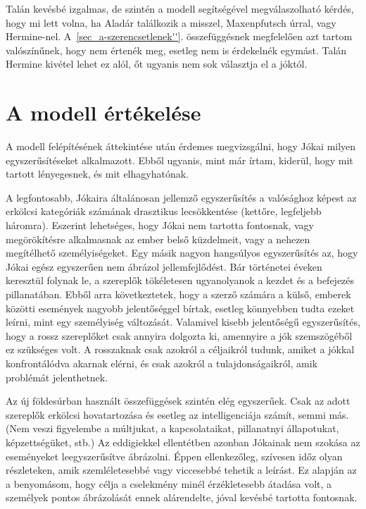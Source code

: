 \documentclass[a4paper,12pt]{thesis-ekf}
\begin{document}
    Talán kevésbé izgalmas, de szintén a modell segítségével megválaszolható kérdés, hogy mi lett volna,
        ha Aladár találkozik a misszel, Maxenpfutsch úrral, vagy Hermine-nel.
    A~\ref{sec_a-szerencsetlenek''}. összefüggésnek megfelelően azt tartom valószínűnek, hogy nem értenék meg,
        esetleg nem is érdekelnék egymást.
    Talán Hermine kivétel lehet ez alól, őt ugyanis nem sok választja el a jóktól.

    \section{A modell értékelése}

    A modell felépítésének áttekintése után érdemes megvizsgálni, hogy Jókai milyen egyszerűsítéseket alkalmazott.
    Ebből ugyanis, mint már írtam, kiderül, hogy mit tartott lényegesnek, és mit elhagyhatónak.

    A legfontosabb, Jókaira általánosan jellemző egyszerűsítés a valósághoz képest az erkölcsi kategóriák számának
        drasztikus lecsökkentése (kettőre, legfeljebb háromra).
    Eszerint lehetséges, hogy Jókai nem tartotta fontosnak, vagy megörökítésre alkalmasnak az ember belső küzdelmeit,
        vagy a nehezen megítélhető személyiségeket.
    Egy másik nagyon hangsúlyos egyszerűsítés az, hogy Jókai egész egyszerűen nem ábrázol jellemfejlődést.
    Bár történetei éveken keresztül folynak le, a szereplők tökéletesen ugyanolyanok a kezdet és a befejezés pillanatában.
    Ebből arra következtetek, hogy a szerző számára a külső, emberek közötti események nagyobb jelentőséggel bírtak,
        esetleg könnyebben tudta ezeket leírni, mint egy személyiség változását.
    Valamivel kisebb jelentőségű egyszerűsítés, hogy a rossz szereplőket csak annyira dolgozta ki,
        amennyire a jók szemszögéből ez szükséges volt.
    A rosszaknak csak azokról a céljaikról tudunk, amiket a jókkal konfrontálódva akarnak elérni, és csak azokról
        a tulajdonságaikról, amik problémát jelenthetnek.

    Az új földesúrban használt összefüggések szintén elég egyszerűek.
    Csak az adott szereplők erkölcsi hovatartozása és esetleg az intelligenciája számít, semmi más.
    (Nem veszi figyelembe a múltjukat, a kapcsolataikat, pillanatnyi állapotukat, képzettségüket, stb.)
    Az eddigiekkel ellentétben azonban Jókainak nem szokása az eseményeket leegyszerűsítve ábrázolni.
    Éppen ellenkezőleg, szívesen időz olyan részleteken, amik szemléletesebbé vagy viccesebbé tehetik a leírást.
    Ez alapján az a benyomásom, hogy célja a cselekmény minél érzékletesebb átadása volt,
        a személyek pontos ábrázolását ennek alárendelte, jóval kevésbé tartotta fontosnak.
\end{document}
